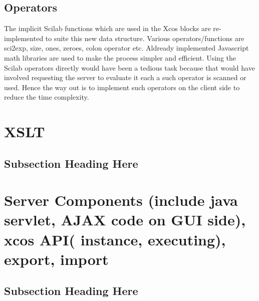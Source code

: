 \documentclass[conference]{IEEEtran}
\begin{document}
\subsection{Operators}
The implicit Scilab functions which are used in the Xcos blocks are re-implemented to suite this new data structure. Various operators/functions are sci2exp, size, ones, zeroes, colon operator etc. Aldready implemented Javascript math libraries are used to make the process simpler and efficient. Using the Scilab operators directly would have been a tedious task because that would have involved requesting the server to evaluate it each a such operator is scanned or used. Hence the way out is to implement such operators on the client side to reduce the time complexity.


\section{XSLT}
\blindtext

\subsection{Subsection Heading Here}
\blindtext

\section{Server Components (include java servlet, AJAX code on GUI side), xcos API( instance, executing), export, import}
\blindtext

\subsection{Subsection Heading Here}
\blindtext


%
%
\end{document}
